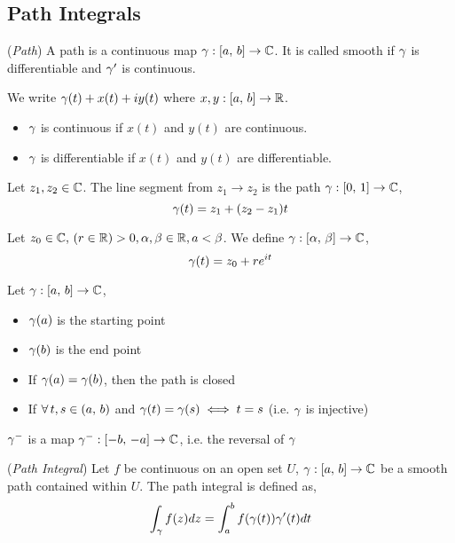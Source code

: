 \documentclass{article}
\begin{document}
\subsection{Path Integrals}
\begin{ndefi}{(\textit{Path})}
  A path is a continuous map $\gamma : [a,\,b] \to \mathbb{C}$. It is called smooth if $\gamma$ is differentiable and $\gamma'$ is continuous.
\end{ndefi}

\noindent
We write $\gamma(t) + x(t) + iy(t)$ where $x, y : [a,\,b] \to \mathbb{R}$.
\begin{itemize}
  \item $\gamma$ is continuous if $x(t)$ and $y(t)$ are continuous.
  \item $\gamma$ is differentiable if $x(t)$ and $y(t)$ are differentiable.
\end{itemize}

\begin{eg}
  Let $z_1, z_2 \in \mathbb{C}$. The line segment from $z_1 \to z_2$ is the path $\gamma : [0,\,1] \to \mathbb{C}$,
  $$ \gamma(t) = z_1 + (z_2 - z_1)t $$
\end{eg}

\begin{eg}
  Let $z_0 \in \mathbb{C}, \, (r\in \mathbb{R}) > 0, \alpha, \beta \in \mathbb{R}, a < \beta$. We define $\gamma : [\alpha,\, \beta] \to \mathbb{C}$,
  $$ \gamma(t) = z_0 + re^{it} $$
\end{eg}

Let $\gamma : [a,\,b] \to \mathbb{C}$,
\begin{itemize}
  \item $\gamma(a)$ is the starting point
  \item $\gamma(b)$ is the end point
  \item If $\gamma(a) = \gamma(b)$, then the path is closed
  \item If $\forall\, t, s \in (a,\, b)$ and $\gamma(t) = \gamma(s) \iff t = s$ (i.e. $\gamma$ is injective)
\end{itemize}

\begin{notation}
  $\gamma^{-}$ is a map $\gamma^- : [-b,\,-a] \to \mathbb{C}$, i.e. the reversal of $\gamma$
\end{notation}

\begin{ndefi}{(\textit{Path Integral})}
  Let $f$ be continuous on an open set $U$, $\gamma : [a,\,b] \to \mathbb{C}$ be a smooth path contained within $U$. The path integral is defined as,
  $$ \int_\gamma f(z)dz = \int_{a}^{b} {f(\gamma(t))\gamma'(t)}dt $$
\end{ndefi}
\end{document}
